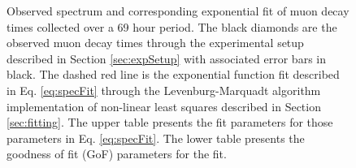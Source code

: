 \documentclass[
    aps, 
    twocolumn, 
    secnumarabic, 
    balancelastpage, 
    amsmath, 
    amssymb, 
    nofootinbib, 
    floatfix
]{revtex4-2}
\begin{document}
\begin{figure}[t]
\begin{subfigure}[t]{12cm}
     	\end{subfigure}
     	\bigskip
	\caption{Observed spectrum and corresponding exponential fit of muon decay times collected over a 69 hour period. The black diamonds are the observed muon decay times through the experimental setup described in Section \ref{sec:expSetup} with associated error bars in black. The dashed red line is the exponential function fit described in Eq. \eqref{eq:specFit} through the Levenburg-Marquadt algorithm implementation of non-linear least squares described in Section \ref{sec:fitting}. The upper table presents the fit parameters for those parameters in Eq. \eqref{eq:specFit}. The lower table presents the goodness of fit (GoF) parameters for the fit.}
	\label{fig:muon_spectrum}
\end{figure}
\end{document}

